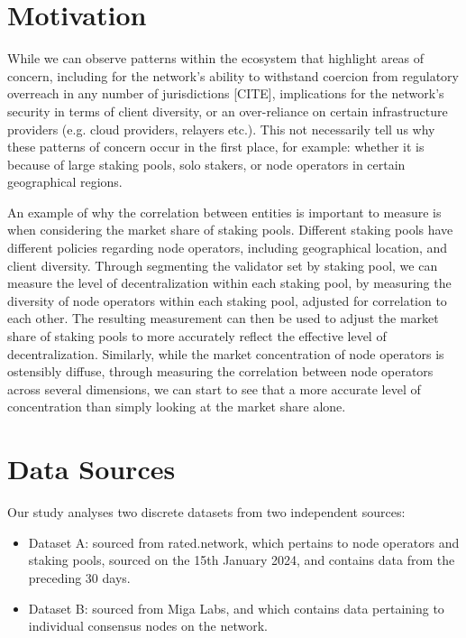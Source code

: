 \documentclass[conference]{IEEEtran}
\begin{document}
\section{Motivation}

While we can observe patterns within the ecosystem that highlight areas of concern, including for the network's ability to withstand coercion from regulatory overreach in any number of jurisdictions [CITE], implications for the network's security in terms of client diversity, or an over-reliance on certain infrastructure providers (e.g. cloud providers, relayers etc.).  This not necessarily tell us why these patterns of concern occur in the first place, for example: whether it is because of large staking pools, solo stakers, or node operators in certain geographical regions.

An example of why the correlation between entities is important to measure is when considering the market share of staking pools. Different staking pools have different policies regarding node operators, including geographical location, and client diversity.  Through segmenting the validator set by staking pool, we can measure the level of decentralization within each staking pool, by measuring the diversity of node operators within each staking pool, adjusted for correlation to each other. The resulting measurement can then be used to adjust the market share of staking pools to more accurately reflect the effective level of decentralization.  Similarly, while the market concentration of node operators is ostensibly diffuse, through measuring the correlation between node operators across several dimensions, we can start to see that a more accurate level of concentration than simply looking at the market share alone.

\section{Data Sources}

Our study analyses two discrete datasets from two independent sources:

\begin{itemize}
    \item Dataset A: sourced from rated.network, which pertains to node operators and staking pools, sourced on the 15th January 2024, and contains data from the preceding 30 days.
    \item Dataset B: sourced from Miga Labs, and which contains data pertaining to individual consensus nodes on the network.
\end{itemize}
\end{document}
